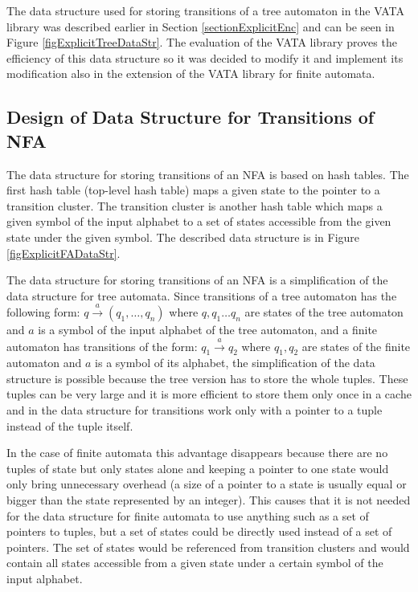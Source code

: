 The data structure used for storing transitions of a tree automaton in the VATA library was described earlier in Section \ref{sectionExplicitEnc} and can be seen
in Figure \ref{figExplicitTreeDataStr}. The evaluation of the VATA library \cite{libvata} proves the efficiency of this data structure so it was
decided to modify it and implement its modification also in the extension of the VATA library for finite automata.

\subsection{Design of Data Structure for Transitions of NFA}
The data structure for storing transitions of an NFA is based on hash tables. The first hash table (top-level hash table) maps a given state to the pointer to
a transition cluster. The transition cluster is another hash table which maps a given symbol of the input alphabet to a set of states accessible from
the given state under the given symbol. 
The described data structure is in Figure \ref{figExplicitFADataStr}.

The data structure for storing transitions of an NFA is a simplification of the data structure for tree automata. Since transitions of a tree automaton
has the following form: $q \xrightarrow{a} (q_1,\ldots,q_n)$ where $q,q_1\ldots q_n$ are states of the tree automaton and $a$ is a symbol of 
the input alphabet of the tree automaton, and a finite automaton has transitions of the form: $q_1 \xrightarrow{a} q_2$ 
where $q_1,q_2$ are states of the finite automaton and $a$ is a symbol of its alphabet, the simplification of the data structure is possible because 
the tree version has to store the whole tuples. These tuples can be very large and it is more efficient to store them only once in a cache and 
in the data structure for transitions work only with a pointer to a tuple instead of the tuple itself. 

In the case of finite automata this advantage disappears because there are no tuples of state but only states alone and keeping a pointer to one state
would only bring unnecessary overhead 
(a size of a pointer to a state is usually equal or bigger than the state represented by an integer). This causes that it is not needed 
for the data structure for finite automata to use 
anything such as a set of pointers to tuples, but a set of states could be directly used instead of
a set of pointers. The set of states would be referenced from transition clusters and would contain all states accessible from a given state under a 
certain symbol of the input alphabet.

